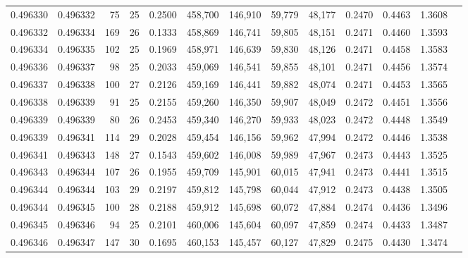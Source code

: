 \begin{tabular}{rrrrrrrrrrrrr}
0.496330 & 0.496332 &  75 &  25 &                                     0.2500 & 458,700 & 146,910 &  59,779 &  48,177 & 0.2470 & 0.4463 & 1.3608 \\
0.496332 & 0.496334 & 169 &  26 &                                     0.1333 & 458,869 & 146,741 &  59,805 &  48,151 & 0.2471 & 0.4460 & 1.3593 \\
0.496334 & 0.496335 & 102 &  25 &                                     0.1969 & 458,971 & 146,639 &  59,830 &  48,126 & 0.2471 & 0.4458 & 1.3583 \\
0.496336 & 0.496337 &  98 &  25 &                                     0.2033 & 459,069 & 146,541 &  59,855 &  48,101 & 0.2471 & 0.4456 & 1.3574 \\
0.496337 & 0.496338 & 100 &  27 &                                     0.2126 & 459,169 & 146,441 &  59,882 &  48,074 & 0.2471 & 0.4453 & 1.3565 \\
0.496338 & 0.496339 &  91 &  25 &                                     0.2155 & 459,260 & 146,350 &  59,907 &  48,049 & 0.2472 & 0.4451 & 1.3556 \\
0.496339 & 0.496339 &  80 &  26 &                                     0.2453 & 459,340 & 146,270 &  59,933 &  48,023 & 0.2472 & 0.4448 & 1.3549 \\
0.496339 & 0.496341 & 114 &  29 &                                     0.2028 & 459,454 & 146,156 &  59,962 &  47,994 & 0.2472 & 0.4446 & 1.3538 \\
0.496341 & 0.496343 & 148 &  27 &                                     0.1543 & 459,602 & 146,008 &  59,989 &  47,967 & 0.2473 & 0.4443 & 1.3525 \\
0.496343 & 0.496344 & 107 &  26 &                                     0.1955 & 459,709 & 145,901 &  60,015 &  47,941 & 0.2473 & 0.4441 & 1.3515 \\
0.496344 & 0.496344 & 103 &  29 &                                     0.2197 & 459,812 & 145,798 &  60,044 &  47,912 & 0.2473 & 0.4438 & 1.3505 \\
0.496344 & 0.496345 & 100 &  28 &                                     0.2188 & 459,912 & 145,698 &  60,072 &  47,884 & 0.2474 & 0.4436 & 1.3496 \\
0.496345 & 0.496346 &  94 &  25 &                                     0.2101 & 460,006 & 145,604 &  60,097 &  47,859 & 0.2474 & 0.4433 & 1.3487 \\
0.496346 & 0.496347 & 147 &  30 &                                     0.1695 & 460,153 & 145,457 &  60,127 &  47,829 & 0.2475 & 0.4430 & 1.3474 \\

\end{tabular}
